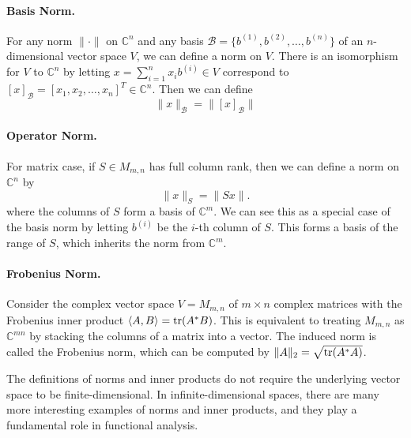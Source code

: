 \documentclass[../main.tex]{subfiles}
\begin{document}
\paragraph{Basis Norm.} For any norm $\|\cdot\|$ on $\mathbb{C}^n$ and any basis $\mathcal{B} = \{b^{(1)}, b^{(2)}, \ldots, b^{(n)}\}$ of an $n$-dimensional vector space $V$, we can define a norm on $V$. There is an isomorphism for $V$ to $\mathbb{C}^n$ by letting $x = \sum_{i=1}^n x_i b^{(i)} \in V$ correspond to $[x]_{\mathcal{B}} = [x_1, x_2, \ldots, x_n]^T \in \mathbb{C}^n$. Then we can define
\begin{equation*}
  \|x\|_\mathcal{B} = \| [x]_{\mathcal{B}} \|
\end{equation*}

\paragraph{Operator Norm.} For matrix case, if $S \in M_{m,n}$ has full column rank, then we can define a norm on $\mathbb{C}^n$ by
\begin{equation}
  \|x\|_S = \|S x\|.
\end{equation}
where the columns of $S$ form a basis of $\mathbb{C}^m$. We can see this as a special case of the basis norm by letting $b^{(i)}$ be the $i$-th column of $S$. This forms a basis of the range of $S$, which inherits the norm from $\mathbb{C}^m$.

\paragraph{Frobenius Norm.} Consider the complex vector space $V = M_{m,n}$ of $m \times n$ complex matrices with the Frobenius inner product $\langle A, B \rangle = \operatorname{tr}(A^*B)$. This is equivalent to treating $M_{m,n}$ as $\mathbb{C}^{mn}$ by stacking the columns of a matrix into a vector. The induced norm is called the Frobenius norm, which can be computed by $\|A\|_2 = \sqrt{\operatorname{tr}(A^*A)}$.

\begin{remark}
  The definitions of norms and inner products do not require the underlying vector space to be finite-dimensional. In infinite-dimensional spaces, there are many more interesting examples of norms and inner products, and they play a fundamental role in functional analysis.
\end{remark}
\end{document}
